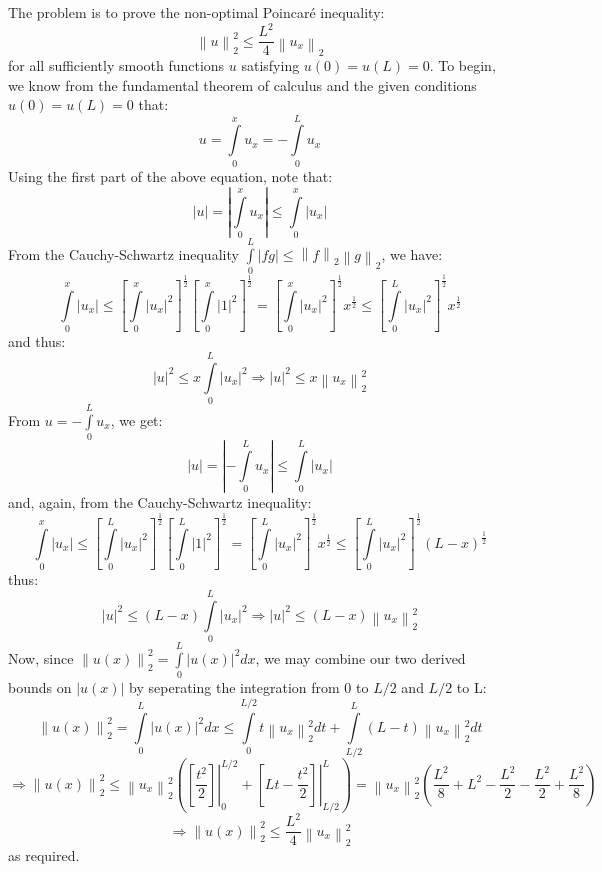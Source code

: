 \begin{homeworkProblem}
The problem is to prove the non-optimal Poincar\'{e} inequality:
\[
\left\| u \right\|_2^2  \leqslant \frac{{L^2 }}
{4}\left\| {u_x } \right\|_2 
\]
for all sufficiently smooth functions $u$ satisfying $u(0)=u(L)=0$.
To begin, we know from the fundamental theorem of calculus and the given conditions $u(0)=u(L)=0$ that:
\[u = \int\limits_0^x {{u_x}}  =  - \int\limits_0^L {{u_x}} \]
Using the first part of the above equation, note that:
\[\left| u \right| = \left| {\int\limits_0^x {{u_x}} } \right| \leqslant \int\limits_0^x {\left| {{u_x}} \right|} \]
From the Cauchy-Schwartz inequality $\int\limits_0^L {\left| {fg} \right|}  \leqslant {\left\| f \right\|_2}{\left\| g \right\|_2}$, we have:
\[\int\limits_0^x {\left| {{u_x}} \right|}  \leqslant {\left[ {\int\limits_0^x {{{\left| {{u_x}} \right|}^2}} } \right]^{\frac{1}{2}}}{\left[ {\int\limits_0^x {{{\left| 1 \right|}^2}} } \right]^{\frac{1}{2}}} = {\left[ {\int\limits_0^x {{{\left| {{u_x}} \right|}^2}} } \right]^{\frac{1}{2}}}{x^{\frac{1}{2}}} \leqslant {\left[ {\int\limits_0^L {{{\left| {{u_x}} \right|}^2}} } \right]^{\frac{1}{2}}}{x^{\frac{1}{2}}}\]
and thus:
\[{\left| u \right|^2} \leqslant x\int\limits_0^L {{{\left| {{u_x}} \right|}^2}}  \Rightarrow {\left| u \right|^2} \leqslant x\left\| {{u_x}} \right\|_2^2\]
From $u =  - \int\limits_0^L {{u_x}} $, we get:
\[\left| u \right| = \left| { - \int\limits_0^L {{u_x}} } \right| \leqslant \int\limits_0^L {\left| {{u_x}} \right|} \]
and, again, from the Cauchy-Schwartz inequality:
\[\int\limits_0^x {\left| {{u_x}} \right|}  \leqslant {\left[ {\int\limits_0^L {{{\left| {{u_x}} \right|}^2}} } \right]^{\frac{1}{2}}}{\left[ {\int\limits_0^L {{{\left| 1 \right|}^2}} } \right]^{\frac{1}{2}}} = {\left[ {\int\limits_0^L {{{\left| {{u_x}} \right|}^2}} } \right]^{\frac{1}{2}}}{x^{\frac{1}{2}}} \leqslant {\left[ {\int\limits_0^L {{{\left| {{u_x}} \right|}^2}} } \right]^{\frac{1}{2}}}{\left( {L - x} \right)^{\frac{1}{2}}}\]
thus:
\[{\left| u \right|^2} \leqslant \left( {L - x} \right)\int\limits_0^L {{{\left| {{u_x}} \right|}^2}}  \Rightarrow {\left| u \right|^2} \leqslant \left( {L - x} \right)\left\| {{u_x}} \right\|_2^2\]
Now, since $\left\| {u\left( x \right)} \right\|_2^2 = \int\limits_0^L {{{\left| {u\left( x \right)} \right|}^2}dx} $, we may combine our two derived bounds on ${\left| {u\left( x \right)} \right|}$ by seperating the integration from 0 to $L/2$ and $L/2$ to L:
\[\left\| {u\left( x \right)} \right\|_2^2 = \int\limits_0^L {{{\left| {u\left( x \right)} \right|}^2}dx}  \leqslant \int\limits_0^{L/2} {t\left\| {{u_x}} \right\|_2^2dt}  + \int\limits_{L/2}^L {\left( {L - t} \right)\left\| {{u_x}} \right\|_2^2dt} \]
\[ \Rightarrow \left\| {u\left( x \right)} \right\|_2^2 \leqslant \left\| {{u_x}} \right\|_2^2\left( {\left. {\left[ {\frac{{{t^2}}}{2}} \right]} \right|_0^{L/2} + \left. {\left[ {Lt - \frac{{{t^2}}}{2}} \right]} \right|_{L/2}^L} \right) = \left\| {{u_x}} \right\|_2^2\left( {\frac{{{L^2}}}{8} + {L^2} - \frac{{{L^2}}}{2} - \frac{{{L^2}}}{2} + \frac{{{L^2}}}{8}} \right)\]
\[ \Rightarrow \left\| {u\left( x \right)} \right\|_2^2 \leqslant \frac{{{L^2}}}{4}\left\| {{u_x}} \right\|_2^2\]
as required.
\end{homeworkProblem}

